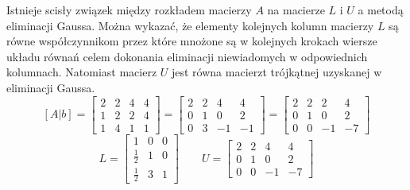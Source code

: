 \documentclass[a4paper,12pt]{article}
\begin{document}
Istnieje scisły związek między rozkładem macierzy $A$ na macierze $L$ i $U$ a metodą eliminacji Gaussa.
Można wykazać, że elementy kolejnych kolumn macierzy $L$ są równe współczynnikom przez które mnożone są w kolejnych krokach wiersze układu równań celem dokonania eliminacji niewiadomych w odpowiednich kolumnach. Natomiast macierz $U$ jest równa macierzt trójkątnej uzyskanej w eliminacji Gaussa.
$$[A|b] = \left[
        \begin{array}{ccrr}
         2 & 2 & 4 & 4\\
         1 & 2 & 2 & 4\\
         1 & 4 & 1 & 1		
         \end{array}
      \right]
 = \left[
       \begin{array}{ccrr}
          2 & 2 & 4 & 4\\
          0 & 1 & 0 & 2\\
          0 & 3 & -1 & -1
       \end{array}
     \right]
= \left[
	\begin{array}{ccrr}
	 2 & 2 & 2 & 4\\
	 0 & 1 & 0 & 2\\
	 0 & 0 & -1 & -7
	\end{array}
	\right]$$
$$ L = \left[
	\begin{array}{ccc}
	1 & 0 & 0 \\
	\frac{1}{2} & 1 & 0 \\
	\frac{1}{2} & 3 & 1
	\end{array}
	\right]
	\qquad
U = \left[
	\begin{array}{ccrr}
	2 & 2 & 4 & 4 \\
	0 & 1 & 0 & 2 \\
	0 & 0 & -1 & -7
	\end{array}
	\right]$$ 
 
\end{document}
